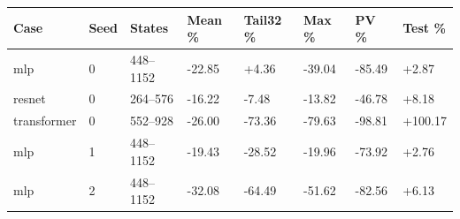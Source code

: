 \begin{tabular}{@{}llllllll@{}}
\toprule
Case & Seed & States & Mean \% & Tail32 \% & Max \% & PV \% & Test \% \\
\midrule
mlp & 0 & 448--1152 & -22.85 & +4.36 & -39.04 & -85.49 & +2.87 \\
resnet & 0 & 264--576 & -16.22 & -7.48 & -13.82 & -46.78 & +8.18 \\
transformer & 0 & 552--928 & -26.00 & -73.36 & -79.63 & -98.81 & +100.17 \\
mlp & 1 & 448--1152 & -19.43 & -28.52 & -19.96 & -73.92 & +2.76 \\
mlp & 2 & 448--1152 & -32.08 & -64.49 & -51.62 & -82.56 & +6.13 \\
\bottomrule
\end{tabular}

